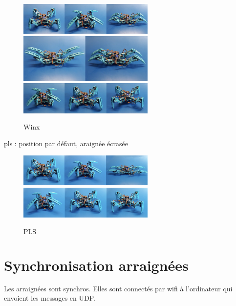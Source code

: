\begin{figure}[H]
	\begin{center}
		\includegraphics[width=0.6\textwidth]{./img/winx_1}
		\includegraphics[width=0.6\textwidth]{./img/winx_2}
		\includegraphics[width=0.6\textwidth]{./img/winx_3}
		\caption{Winx}
	\end{center}
\end{figure}

pls : position par défaut, araignée écrasée

\begin{figure}[H]
	\begin{center}
		\includegraphics[width=0.6\textwidth]{./img/pls_1}
		\includegraphics[width=0.6\textwidth]{./img/pls_2}
		\caption{PLS}
	\end{center}
\end{figure}

		\section{Synchronisation arraignées}

Les arraignées sont synchros. Elles sont connectés par wifi à l'ordinateur qui envoient les messages en UDP.

